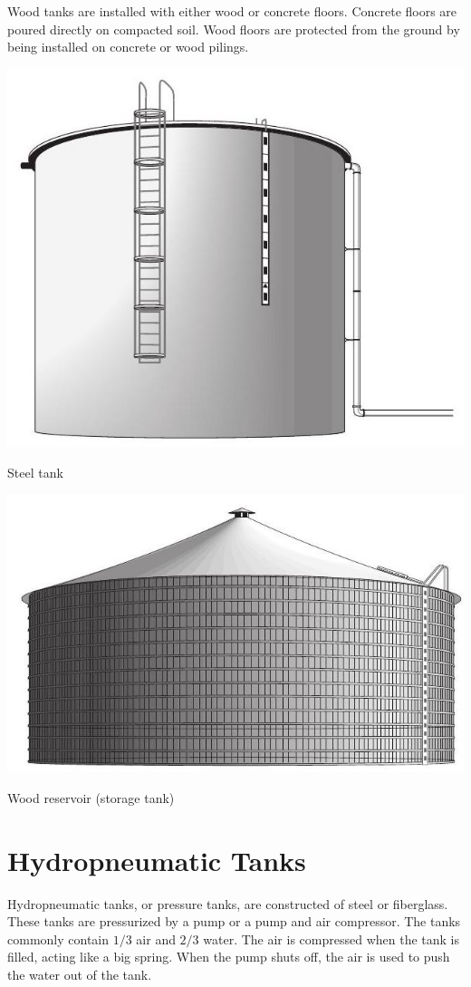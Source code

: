 \documentclass[10pt]{article}
\begin{document}
Wood tanks are installed with either wood or concrete floors. Concrete floors are poured directly on compacted soil. Wood floors are protected from the ground by being installed on concrete or wood pilings.

\includegraphics[max width=\textwidth]{2022_11_03_fc0cbc2f3612fab6edd2g-30}

Steel tank

\includegraphics[max width=\textwidth]{2022_11_03_fc0cbc2f3612fab6edd2g-30(1)}

Wood reservoir (storage tank)

\section{Hydropneumatic Tanks}
Hydropneumatic tanks, or pressure tanks, are constructed of steel or fiberglass. These tanks are pressurized by a pump or a pump and air compressor. The tanks commonly contain $1 / 3$ air and $2 / 3$ water. The air is compressed when the tank is filled, acting like a big spring. When the pump shuts off, the air is used to push the water out of the tank.
\end{document}
